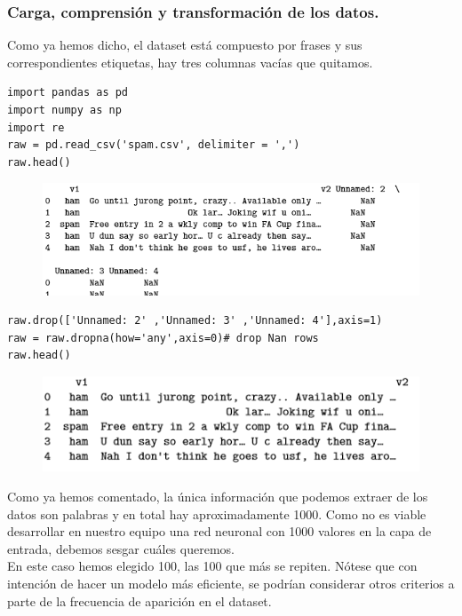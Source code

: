 \documentclass[a4paper,11pt]{article}
\begin{document}
\subsubsection{Carga, comprensión y transformación de los datos.}
Como ya hemos dicho, el dataset está compuesto por frases y sus correspondientes etiquetas, hay tres columnas vacías que quitamos.
\begin{lstlisting}
import pandas as pd
import numpy as np
import re
raw = pd.read_csv('spam.csv', delimiter = ',')
raw.head()
\end{lstlisting}
\begin{figure}[H]
\centering
\includegraphics[scale=0.9]{Annotation 2020-03-23 174228.png}
\end{figure}
\begin{lstlisting}
raw.drop(['Unnamed: 2' ,'Unnamed: 3' ,'Unnamed: 4'],axis=1)
raw = raw.dropna(how='any',axis=0)# drop Nan rows
raw.head()
\end{lstlisting}
\begin{figure}[H]
\centering
\includegraphics{Annotation 2020-03-23 174341.png}
\end{figure}
Como ya hemos comentado, la única información que podemos extraer de los datos son palabras y en total hay aproximadamente 1000. Como no es viable desarrollar en nuestro equipo una red neuronal con 1000 valores en la capa de entrada, debemos sesgar cuáles queremos.\\ 

\noindent
En este caso hemos elegido 100, las 100 que más se repiten. Nótese que con intención de hacer un modelo más eficiente, se podrían considerar otros criterios a parte de la frecuencia de aparición en el dataset.\\
\end{document}
